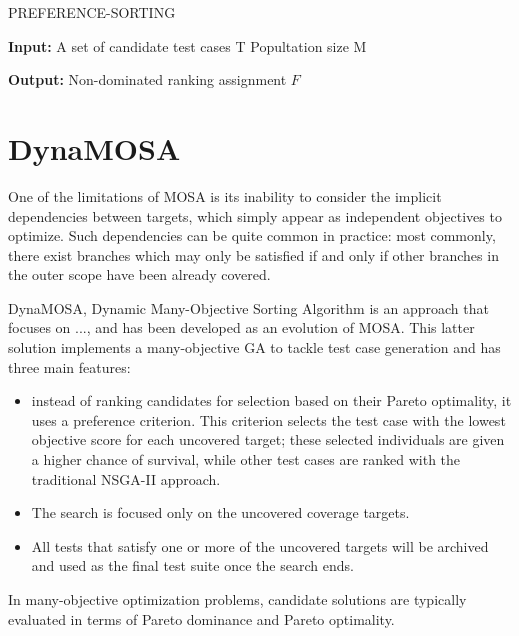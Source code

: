 \begin{algorithm}
    \caption{PREFERENCE-SORTING}
    \hspace*{\algorithmicindent} \textbf{Input:} 
    A set of candidate test cases T
    Popultation size M

    \hspace*{\algorithmicindent} \textbf{Output:}
    Non-dominated ranking assignment $ F $
    
    \begin{algorithmic}[1]
        \Begin

        \End 
    \end{algorithmic}
\end{algorithm}





\section{DynaMOSA}
One of the limitations of MOSA is its inability to consider the implicit dependencies between targets, which simply appear as independent objectives to optimize. Such dependencies can be quite common in practice: most commonly, there exist branches which may only be satisfied if and only if other branches in the outer scope have been already covered. 


DynaMOSA, Dynamic Many-Objective Sorting Algorithm \cite{DBLP:journals/tse/PanichellaKT18} is an approach that focuses on ..., and has been developed as an evolution of MOSA. This latter solution implements a many-objective GA to tackle test case generation and has three main features: 
\begin{itemize}
    \item instead of ranking candidates for selection based on their Pareto optimality, it uses a preference criterion. This criterion selects the test case with the lowest objective score for each uncovered target; these selected individuals are given a higher chance of survival, while other test cases are ranked with the traditional NSGA-II approach.
    \item The search is focused only on the uncovered coverage targets.
    \item All tests that satisfy one or more of the uncovered targets will be archived and used as the final test suite once the search ends.
\end{itemize}

In many-objective optimization problems, candidate solutions are typically evaluated in terms of Pareto dominance and Pareto optimality.

